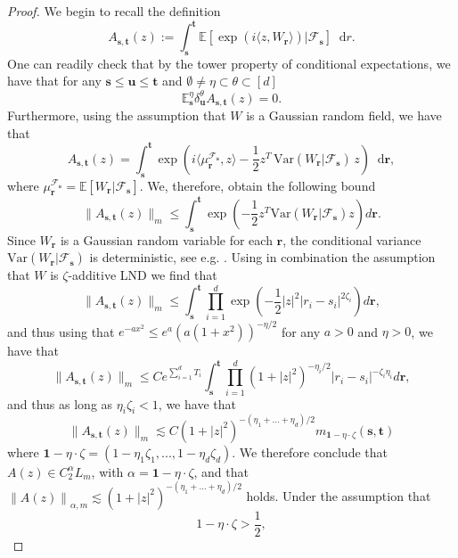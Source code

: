 \documentclass[11pt,oneside,english,reqno]{amsart}
\numberwithin{equation}{section}
\numberwithin{figure}{section}
\theoremstyle{plain}
\theoremstyle{definition}
\theoremstyle{remark}
\theoremstyle{plain}
\theoremstyle{plain}
\theoremstyle{plain}
\theoremstyle{plain}
\theoremstyle{plain}
\newcommand{\cF}{\mathcal{F}}
\newcommand{\EE}{\mathbb{E}}
\newcommand{\br}{\mathbf{r}}
\newcommand{\bu}{\mathbf{u}}
\newcommand{\bs}{\mathbf{s}}
\newcommand{\bt}{\mathbf{t}}
\newcommand{\dd}{\mathop{}\!\mathrm{d}}
\newcommand{\norm}[1]{\left\lVert #1\right\rVert}
\newcommand{\abs}[1]{\left\lvert #1\right\rvert}
\begin{document}
\begin{proof}
  We begin to recall the definition
    \begin{equation}
        A_{\bs,\bt}(z) := \int_{\bs}^\bt \EE[\exp(i\langle z,W_\br \rangle )|\cF_{\bs}]\dd r.
    \end{equation}
One can readily check that by the tower property of conditional expectations, we have that for any $\bs\le \bu\le \bt$  and $\emptyset\neq\eta\subset\theta\subset [d]$
\[
\EE^\eta_\bs\delta_\bu^\theta A_{\bs,\bt}(z)=0. 
\]
Furthermore, using the assumption that $W$ is a Gaussian random field, we have that 
\[
A_{\bs,\bt}(z) = \int_\bs^\bt \exp\left( i\langle \mu_\br^{\cF_\bs},z\rangle -\frac{1}{2}z^T \,\mathrm{Var}(W_\br|\cF_\bs) \, z\right)\dd \br, 
\]
where $\mu_\br^{\cF_\bs}=\EE[W_\br|\cF_\bs]$.
We, therefore, obtain the following bound 
\[
\|A_{\bs, \bt}(z)\|_m\leq \int_{\bs}^\bt \exp(-\frac{1}{2}z^T\mathrm{Var}(W_\br|\cF_\bs) z)d\br.
\]
Since $W_\br$ is a Gaussian random variable for each $\br$, the conditional variance $\mbox{Var}(W_\br|\mathcal{F}_\bs)$ is deterministic, see e.g. \cite{Bogachev2008GaussianM}. 
Using in  combination the assumption that $W$ is $\zeta$-additive LND we  find that 
\begin{equation}\label{eq:using Additive LND 1}
    \|A_{\bs, \bt}(z)\|_m\leq \int_{\bs}^\bt \prod_{i=1}^d \exp\left(-\frac{1}{2}|z|^2|r_i-s_i|^{2\zeta_i}\right)d\br, 
\end{equation}
and thus using that $e^{-ax^2}\leq e^a(a(1+x^2))^{-\eta/2}$ for any $a>0$ and  $\eta>0$, we have that 
\begin{equation}\label{eq: using additve LND cont.}
    \|A_{\bs, \bt}(z)\|_m\leq C e^{\sum_{i=1}^d T_i } \int_{\bs}^\bt \prod_{i=1}^d (1+|z|^2)^{-\eta_i/2}|r_i-s_i|^{-\zeta_i\eta_i} d\br, 
\end{equation}
and thus as long as $\eta_i\zeta_i< 1$, we have that 
\begin{equation}\label{eq:bound on A}
    \|A_{\bs, \bt}(z)\|_m\lesssim  C (1+|z|^2)^{-(\eta_1+...+\eta_d)/2} m_{\mathbf{1}-\eta\cdot \zeta}(\bs,\bt)
\end{equation}
where $\mathbf{1}-\eta\cdot \zeta=(1-\eta_1\zeta_1,...,1-\eta_d\zeta_d).$ We therefore conclude that $A(z)\in C^{\alpha}_2 L_m$, with $\alpha=\mathbf{1}-\eta\cdot \zeta$, and that $\norm{A(z)}_{\alpha,m} \lesssim (1+\abs{z}^2)^{-(\eta_1+\dots+\eta_d)/2}$ holds. Under the assumption that 
\begin{equation}
    1-\eta\cdot \zeta>{\frac{1}{2}},
\end{equation}

\end{proof}
\end{document}
